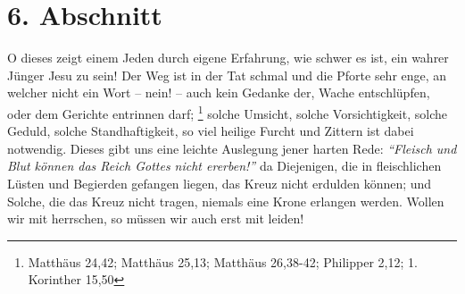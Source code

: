 \section{6. Abschnitt} \label{kap3_ab6} 

O dieses zeigt einem Jeden durch eigene Erfahrung, wie schwer es ist, ein wahrer
Jünger Jesu zu sein! Der Weg ist in der Tat schmal und die Pforte sehr enge, an
welcher nicht ein Wort -- nein! -- auch kein Gedanke der, Wache entschlüpfen, oder
dem Gerichte entrinnen darf;
\footnote{Matthäus 24,42; Matthäus 25,13; Matthäus 26,38-42;
Philipper 2,12; 1. Korinther 15,50}
solche Umsicht, solche Vorsichtigkeit, solche Geduld,
solche Standhaftigkeit, so viel heilige Furcht und Zittern ist dabei notwendig.
Dieses gibt uns eine leichte Auslegung jener harten Rede:
\textit{"`Fleisch und Blut können das Reich Gottes nicht ererben!"'}
da Diejenigen, die in fleischlichen
Lüsten und Begierden gefangen liegen, das Kreuz nicht erdulden können; und
Solche, die das Kreuz nicht tragen, niemals eine Krone erlangen werden. Wollen
wir mit herrschen, so müssen wir auch erst mit leiden!

